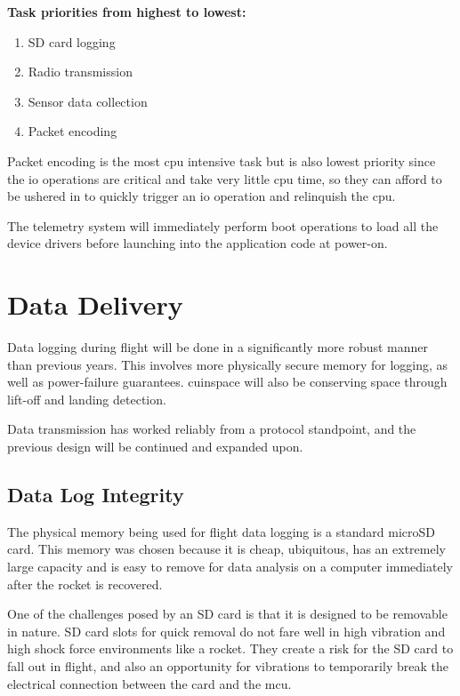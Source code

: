 \textbf{Task priorities from highest to lowest:}

\begin{enumerate}
    \item SD card logging
    \item Radio transmission
    \item Sensor data collection
    \item Packet encoding
\end{enumerate}

Packet encoding is the most \gls{cpu} intensive task but is also lowest priority since the \gls{io} operations are
critical and take very little \gls{cpu} time, so they can afford to be ushered in to quickly trigger an \gls{io}
operation and relinquish the \gls{cpu}.

The telemetry system will immediately perform boot operations to load all the device drivers before launching into the
application code at power-on.

\section{Data Delivery}

Data logging during flight will be done in a significantly more robust manner than previous years. This involves more
physically secure memory for logging, as well as power-failure guarantees. \Gls{cuinspace} will also be conserving
space through lift-off and landing detection.

Data transmission has worked reliably from a protocol standpoint, and the previous design will be continued and
expanded upon.

\subsection{Data Log Integrity}

The physical memory being used for flight data logging is a standard microSD card. This memory was chosen because it is
cheap, ubiquitous, has an extremely large capacity and is easy to remove for data analysis on a computer immediately
after the rocket is recovered.

One of the challenges posed by an SD card is that it is designed to be removable in nature. SD card slots for quick
removal do not fare well in high vibration and high shock force environments like a rocket. They create a risk for the
SD card to fall out in flight, and also an opportunity for vibrations to temporarily break the electrical connection
between the card and the \gls{mcu}.

